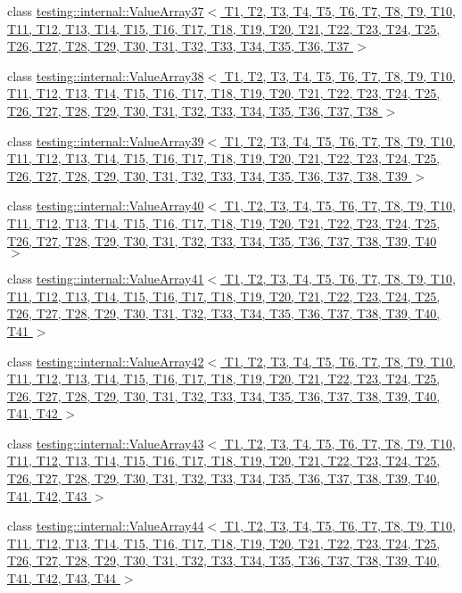 \begin{DoxyCompactItemize}
\item 
class \hyperlink{classtesting_1_1internal_1_1_value_array37}{testing\-::internal\-::\-Value\-Array37$<$ T1, T2, T3, T4, T5, T6, T7, T8, T9, T10, T11, T12, T13, T14, T15, T16, T17, T18, T19, T20, T21, T22, T23, T24, T25, T26, T27, T28, T29, T30, T31, T32, T33, T34, T35, T36, T37 $>$}
\item 
class \hyperlink{classtesting_1_1internal_1_1_value_array38}{testing\-::internal\-::\-Value\-Array38$<$ T1, T2, T3, T4, T5, T6, T7, T8, T9, T10, T11, T12, T13, T14, T15, T16, T17, T18, T19, T20, T21, T22, T23, T24, T25, T26, T27, T28, T29, T30, T31, T32, T33, T34, T35, T36, T37, T38 $>$}
\item 
class \hyperlink{classtesting_1_1internal_1_1_value_array39}{testing\-::internal\-::\-Value\-Array39$<$ T1, T2, T3, T4, T5, T6, T7, T8, T9, T10, T11, T12, T13, T14, T15, T16, T17, T18, T19, T20, T21, T22, T23, T24, T25, T26, T27, T28, T29, T30, T31, T32, T33, T34, T35, T36, T37, T38, T39 $>$}
\item 
class \hyperlink{classtesting_1_1internal_1_1_value_array40}{testing\-::internal\-::\-Value\-Array40$<$ T1, T2, T3, T4, T5, T6, T7, T8, T9, T10, T11, T12, T13, T14, T15, T16, T17, T18, T19, T20, T21, T22, T23, T24, T25, T26, T27, T28, T29, T30, T31, T32, T33, T34, T35, T36, T37, T38, T39, T40 $>$}
\item 
class \hyperlink{classtesting_1_1internal_1_1_value_array41}{testing\-::internal\-::\-Value\-Array41$<$ T1, T2, T3, T4, T5, T6, T7, T8, T9, T10, T11, T12, T13, T14, T15, T16, T17, T18, T19, T20, T21, T22, T23, T24, T25, T26, T27, T28, T29, T30, T31, T32, T33, T34, T35, T36, T37, T38, T39, T40, T41 $>$}
\item 
class \hyperlink{classtesting_1_1internal_1_1_value_array42}{testing\-::internal\-::\-Value\-Array42$<$ T1, T2, T3, T4, T5, T6, T7, T8, T9, T10, T11, T12, T13, T14, T15, T16, T17, T18, T19, T20, T21, T22, T23, T24, T25, T26, T27, T28, T29, T30, T31, T32, T33, T34, T35, T36, T37, T38, T39, T40, T41, T42 $>$}
\item 
class \hyperlink{classtesting_1_1internal_1_1_value_array43}{testing\-::internal\-::\-Value\-Array43$<$ T1, T2, T3, T4, T5, T6, T7, T8, T9, T10, T11, T12, T13, T14, T15, T16, T17, T18, T19, T20, T21, T22, T23, T24, T25, T26, T27, T28, T29, T30, T31, T32, T33, T34, T35, T36, T37, T38, T39, T40, T41, T42, T43 $>$}
\item 
class \hyperlink{classtesting_1_1internal_1_1_value_array44}{testing\-::internal\-::\-Value\-Array44$<$ T1, T2, T3, T4, T5, T6, T7, T8, T9, T10, T11, T12, T13, T14, T15, T16, T17, T18, T19, T20, T21, T22, T23, T24, T25, T26, T27, T28, T29, T30, T31, T32, T33, T34, T35, T36, T37, T38, T39, T40, T41, T42, T43, T44 $>$}

\end{DoxyCompactItemize}
